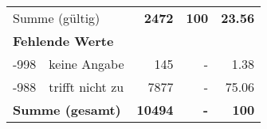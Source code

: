 \begin{longtable}{lXrrr}
     \midrule
     \multicolumn{2}{l}{Summe (gültig)} &
       \textbf{\num{2472}} &
     \textbf{\num{100}} &
       \textbf{\num[round-mode=places,round-precision=2]{23.56}} \\
     \multicolumn{5}{l}{\textbf{Fehlende Werte}}\\
       -998 &
       keine Angabe &
         \num{145} &
        - &
         \num[round-mode=places,round-precision=2]{1.38} \\
       -988 &
       trifft nicht zu &
         \num{7877} &
        - &
         \num[round-mode=places,round-precision=2]{75.06} \\
     \midrule
     \multicolumn{2}{l}{\textbf{Summe (gesamt)}} &
          \textbf{\num{10494}} &
        \textbf{-} &
        \textbf{\num{100}} \\
     \bottomrule
     \end{longtable}
     
